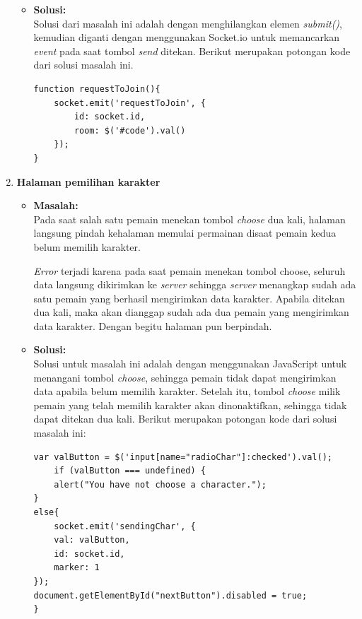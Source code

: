 \begin{enumerate}
\begin{itemize}
		\item \textbf{Solusi:} \\
		Solusi dari masalah ini adalah dengan menghilangkan elemen \textit{submit()}, kemudian diganti dengan menggunakan Socket.io untuk memancarkan \textit{event} pada saat tombol \textit{send} ditekan. Berikut merupakan potongan kode dari solusi masalah ini.
		
\begin{lstlisting}[caption={Proses memancarkan \textit{event}}, label={lst:emitEvent}, captionpos=b]
function requestToJoin(){
	socket.emit('requestToJoin', {
		id: socket.id,
		room: $('#code').val()
	});
}
\end{lstlisting}	
	\end{itemize}
	
	\item \textbf{Halaman pemilihan karakter}
	\begin{itemize}
		\item \textbf{Masalah:} \\
		Pada saat salah satu pemain menekan tombol \textit{choose} dua kali, halaman langsung pindah kehalaman memulai permainan disaat pemain kedua belum memilih karakter.
		
		\textit{Error} terjadi karena pada saat pemain menekan tombol choose, seluruh data langsung dikirimkan ke \textit{server} sehingga \textit{server} menangkap sudah ada satu pemain yang berhasil mengirimkan data karakter. Apabila ditekan dua kali, maka akan dianggap sudah ada dua pemain yang mengirimkan data karakter. Dengan begitu halaman pun berpindah.
		
		\item \textbf{Solusi:} \\
		Solusi untuk masalah ini adalah dengan menggunakan JavaScript untuk menangani tombol \textit{choose}, sehingga pemain tidak dapat mengirimkan data apabila belum memilih karakter. Setelah itu, tombol \textit{choose}  milik pemain yang telah memilih karakter akan dinonaktifkan, sehingga tidak dapat ditekan dua kali. Berikut merupakan potongan kode dari solusi masalah ini:
		
\begin{lstlisting}[caption={Proses menangani tombol \textit{choose}}, label={lst:tombolChoose},captionpos=b]
var valButton = $('input[name="radioChar"]:checked').val();
	if (valButton === undefined) {
	alert("You have not choose a character.");
}
else{
	socket.emit('sendingChar', {
	val: valButton,
	id: socket.id,
	marker: 1
});
document.getElementById("nextButton").disabled = true;
}
\end{lstlisting}
	\end{itemize}


\end{enumerate}
